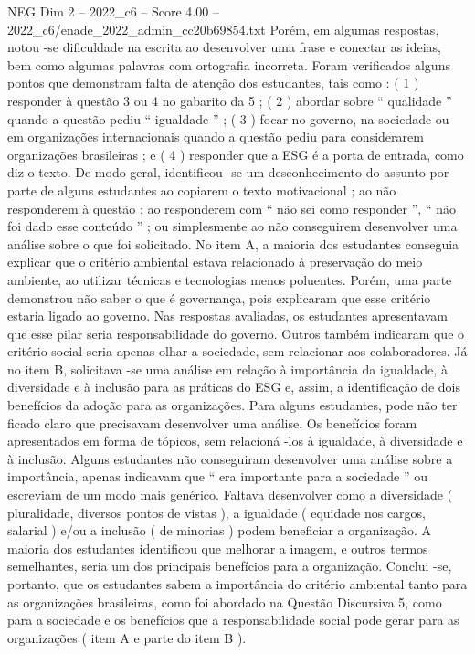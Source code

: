 \begin{textsample}{NEG Dim 2 – 2022\_c6 – Score 4.00 – 2022\_c6/enade\_2022\_admin\_cc20b69854.txt}
Porém, em algumas respostas, notou -se dificuldade na escrita ao desenvolver uma frase e conectar as ideias, bem como algumas palavras com ortografia incorreta.
Foram verificados alguns pontos que demonstram falta de atenção dos estudantes, tais como : ( 1 ) responder à questão 3 ou 4 no gabarito da 5 ; ( 2 ) abordar sobre “ qualidade ” quando a questão pediu “ igualdade ” ; ( 3 ) focar no governo, na sociedade ou em organizações internacionais quando a questão pediu para considerarem organizações brasileiras ; e ( 4 ) responder que a ESG é a porta de entrada, como diz o texto.
De modo geral, identificou -se um desconhecimento do assunto por parte de alguns estudantes ao copiarem o texto motivacional ; ao não responderem à questão ; ao responderem com “ não sei como responder ”, “ não foi dado esse conteúdo ” ; ou simplesmente ao não conseguirem desenvolver uma análise sobre o que foi solicitado.
No item A, a maioria dos estudantes conseguia explicar que o critério ambiental estava relacionado à preservação do meio ambiente, ao utilizar técnicas e tecnologias menos poluentes.
Porém, uma parte demonstrou não saber o que é governança, pois explicaram que esse critério estaria ligado ao governo.
Nas respostas avaliadas, os estudantes apresentavam que esse pilar seria responsabilidade do governo.
Outros também indicaram que o critério social seria apenas olhar a sociedade, sem relacionar aos colaboradores.
Já no item B, solicitava -se uma análise em relação à importância da igualdade, à diversidade e à inclusão para as práticas do ESG e, assim, a identificação de dois benefícios da adoção para as organizações.
Para alguns estudantes, pode não ter ficado claro que precisavam desenvolver uma análise.
Os benefícios foram apresentados em forma de tópicos, sem relacioná -los à igualdade, à diversidade e à inclusão.
Alguns estudantes não conseguiram desenvolver uma análise sobre a importância, apenas indicavam que “ era importante para a sociedade ” ou escreviam de um modo mais genérico.
Faltava desenvolver como a diversidade ( pluralidade, diversos pontos de vistas ), a igualdade ( equidade nos cargos, salarial ) e/ou a inclusão ( de minorias ) podem beneficiar a organização.
A maioria dos estudantes identificou que melhorar a imagem, e outros termos semelhantes, seria um dos principais benefícios para a organização.
Conclui -se, portanto, que os estudantes sabem a importância do critério ambiental tanto para as organizações brasileiras, como foi abordado na Questão Discursiva 5, como para a sociedade e os benefícios que a responsabilidade social pode gerar para as organizações ( item A e parte do item B ).

\end{textsample}
